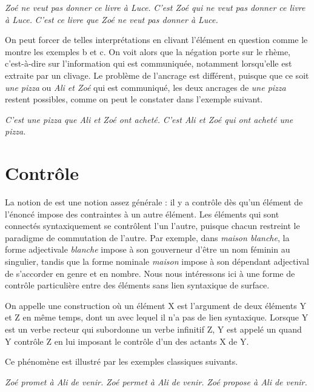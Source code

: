{\ea\label{ex:13-negation} 
\ea \textit{Zoé ne veut pas donner ce livre à Luce.}
\ex \textit{C’est Zoé qui ne veut pas donner ce livre à Luce.}
\ex \textit{C’est ce livre que Zoé ne veut pas donner à Luce.}\z\z

On peut forcer de telles interprétations en clivant l’élément en question comme le montre les exemples b et c. On voit alors que la négation porte sur le rhème, c’est-à-dire sur l’information qui est communiquée, notamment lorsqu’elle est extraite par un clivage. Le problème de l’ancrage est différent, puisque que ce soit \textit{une pizza} ou \textit{Ali et Zoé} qui est communiqué, les deux ancrages de \textit{une pizza} restent possibles, comme on peut le constater dans l’exemple suivant.

\ea
\ea \textit{C’est une pizza que Ali et Zoé ont acheté.}
\ex \textit{C’est Ali et Zoé qui ont acheté une pizza.}\z\z}

\section{Contrôle}
\label{sec:13-controle}
La notion de  est une notion assez générale : il y a contrôle dès qu’un élément de l’énoncé impose des contraintes à un autre élément. Les éléments qui sont connectés syntaxiquement se contrôlent l’un l’autre, puisque chacun restreint le paradigme de commutation de l’autre. Par exemple, dans \textit{maison blanche}, la forme adjectivale \textit{blanche} impose à son gouverneur d’être un nom féminin au singulier, tandis que la forme nominale \textit{maison} impose à son dépendant adjectival de s’accorder en genre et en nombre. Nous nous intéressons ici à une forme de contrôle particulière entre des éléments sans lien syntaxique de surface.

{On appelle  une construction où un élément X est l’argument de deux éléments Y et Z en même temps, dont un avec lequel il n’a pas de lien syntaxique. Lorsque Y est un verbe recteur qui subordonne un verbe infinitif Z, Y est appelé un  quand Y contrôle Z en lui imposant le contrôle d’un des actants X de Y.}

Ce phénomène est illustré par les exemples classiques suivants.

\ea\label{ex:13-venir}
\ea\textit{Zoé promet à Ali de venir.}
\ex\textit{Zoé permet à Ali de venir.}
\ex\textit{Zoé propose à Ali de venir.}\z\z

